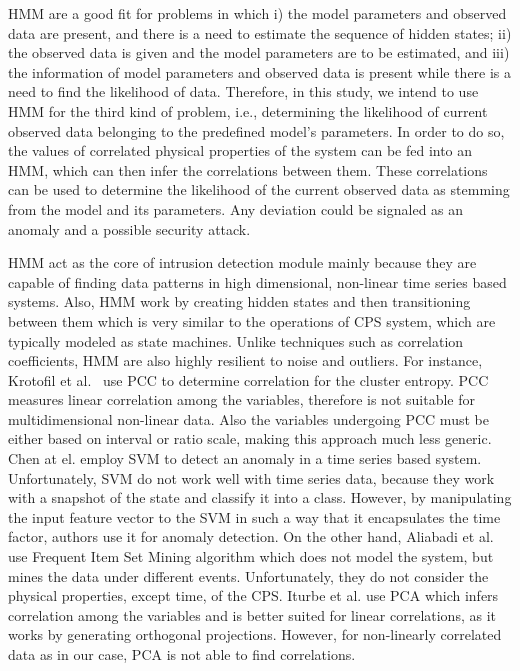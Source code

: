 \ac{HMM} are a good fit for problems in which i) the model parameters and observed data are present, and there is a need to estimate the sequence of hidden states; ii) the observed data is given and the model parameters are to be estimated, and iii) the information of model parameters and observed data is present while there is a need to find the likelihood of data. Therefore, in this study, we intend to use \ac{HMM} for the third kind of problem, i.e., determining the likelihood of current observed data belonging to the predefined model's parameters. In order to do so, the values of correlated physical properties of the system can be fed into an \ac{HMM}, which can then infer the correlations between them. These correlations can be used to determine the likelihood of the current observed data as stemming from the model and its parameters. Any deviation could be signaled as an anomaly and a possible security attack.

\ac{HMM} act as the core of intrusion detection module mainly because they are capable of finding data patterns in high dimensional, non-linear time series based systems. Also, \ac{HMM} work by creating hidden states and then transitioning between them which is very similar to the operations of \ac{CPS} system, which are typically modeled as state machines.
Unlike techniques such as correlation coefficients, \ac{HMM} are also highly resilient to noise and outliers. 
For instance, Krotofil et al.~\cite{krotofil2015process} use \acf{PCC} to determine correlation for the cluster entropy. \ac{PCC} measures linear correlation among the variables, therefore is not suitable for multidimensional non-linear data. Also the variables undergoing \ac{PCC} must be either based on interval or ratio scale, making this approach much less generic. Chen at el.  \cite{chen2018learning} employ \ac{SVM} to detect an anomaly in a time series based system. Unfortunately, \ac{SVM} do not work well with time series data, because they work with a snapshot of the state and classify it into a class. However, by manipulating the input feature vector to the \ac{SVM} in such a way that it encapsulates the time factor, authors use it for anomaly detection. On the other hand, Aliabadi et al. ~\cite{aliabadi2017artinali} use Frequent Item Set Mining algorithm which does not model the system, but mines the data under different events. Unfortunately, they do not consider the physical properties, except time, of the \ac{CPS}. Iturbe et al. \cite{iturbe2017feasibility} use \ac{PCA} which infers correlation among the variables and is better suited for linear correlations, as it works by generating orthogonal projections. However, for non-linearly correlated data as in our case, \ac{PCA} is not able to find correlations.


